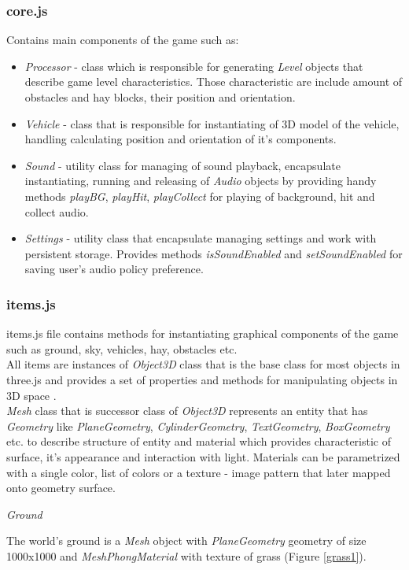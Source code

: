 \documentclass[12pt]{article}
\begin{document}
\subsubsection{core.js}
Contains main components of the game such as:
\begin{itemize}
\item \textit{Processor} - class which is responsible for generating \textit{Level} objects that describe game level characteristics. Those characteristic are include amount of obstacles and hay blocks, their position and orientation.
\item \textit{Vehicle} - class that is responsible for instantiating of 3D model of the vehicle, handling calculating position and orientation of it's components.
\item \textit{Sound} - utility class for managing of sound playback, encapsulate instantiating, running and releasing of \textit{Audio} objects by providing handy methods \textit{playBG}, \textit{playHit}, \textit{playCollect} for playing of background, hit and collect audio.
\item \textit{Settings} - utility class that encapsulate managing settings and work with persistent storage. Provides methods \textit{isSoundEnabled} and \textit{setSoundEnabled} for saving user's audio policy preference.
\end{itemize}
\subsubsection{items.js}
items.js file contains methods for instantiating  graphical components of the game such as ground, sky, vehicles, hay, obstacles etc. 
\\
All items are instances of \textit{Object3D} class that is the base class for most objects in three.js and provides a set of properties and methods for manipulating objects in 3D space \citep{threeapi:object3d}. 
\\
\textit{Mesh} class that is successor class of \textit{Object3D} represents an entity that has \textit{Geometry} like \textit{PlaneGeometry}, \textit{CylinderGeometry}, \textit{TextGeometry}, \textit{BoxGeometry} etc. to describe structure of entity and material which provides characteristic of surface, it's appearance and interaction with light. Materials can be parametrized with a single color, list of colors or a texture - image pattern that later mapped onto geometry surface.
\par
\textit{Ground}
\par
The world's ground is a \textit{Mesh} object with \textit{PlaneGeometry} geometry of size 1000x1000 and \textit{MeshPhongMaterial} with texture of grass (Figure \ref{grass1}). 
\end{document}
